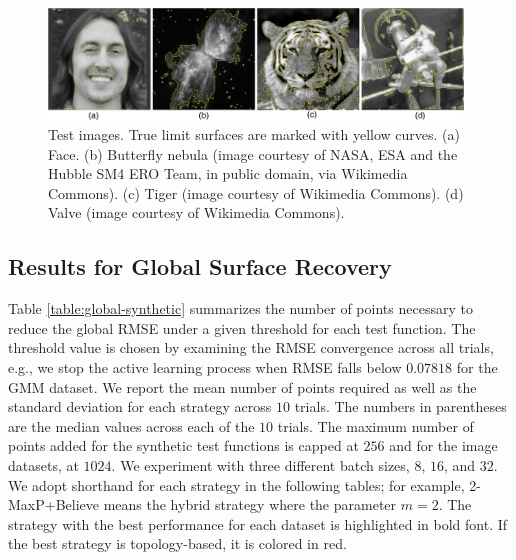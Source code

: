 \begin{figure}[b]
\centering
\includegraphics[width=0.98\textwidth]{figs/chap5/images}
\caption{Test images. True limit surfaces are marked with yellow curves.
%
(a) Face.
%
(b) Butterfly nebula (image courtesy of NASA, ESA and the Hubble SM4 ERO Team,
in public domain, via Wikimedia Commons).
%
(c) Tiger (image courtesy of Wikimedia Commons).
%
(d) Valve (image courtesy of Wikimedia Commons).}
\label{fig:images}
\end{figure}

\subsection{Results for Global Surface Recovery}
\label{sec:global_results}
%
Table \ref{table:global-synthetic} summarizes the number of points necessary to reduce the global RMSE under a given threshold for each test function.
%
The threshold value is chosen by examining the RMSE convergence across all trials, e.g., we stop the active learning process when RMSE falls below $0.07818$ for the GMM dataset.
%
We report the mean number of points required as well as the standard deviation for each strategy across $10$ trials.
%
The numbers in parentheses are the median values across each of the $10$ trials.
%
The maximum number of points added for the synthetic test functions is capped at $256$ and for the image datasets, at $1024$.
%
We experiment with three different batch sizes, $8$, $16$, and $32$.
%
We adopt shorthand for each strategy in the following tables; for example, 2-MaxP+Believe means the hybrid strategy where the parameter $m = 2$.
%
The strategy with the best performance for each dataset is highlighted in bold font.
%
If the best strategy is topology-based, it is colored in red.

